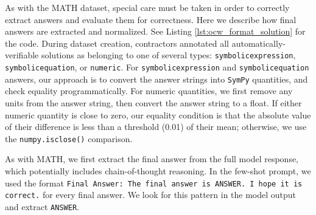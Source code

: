 \documentclass{article}
\begin{document}
As with the MATH dataset, special care must be taken in order to correctly extract answers and evaluate them for correctness. Here we describe how final answers are extracted and normalized. See Listing \ref{lst:ocw_format_solution} for the code. During dataset creation, contractors annotated all automatically-verifiable solutions as belonging to one of several types:  \texttt{symbolicexpression}, \texttt{symbolicequation}, or \texttt{numeric}. For \texttt{symbolicexpression} and \texttt{symbolicequation} answers, our approach is to convert the answer strings into \texttt{SymPy} quantities, and check equality programmatically.  For numeric quantities, we first remove any units from the answer string, then convert the answer string to a float.  If either numeric quantity is close to zero, our equality condition is that the absolute value of their difference is less than a threshold (0.01) of their mean; otherwise, we use the \texttt{numpy.isclose()} comparison.

As with MATH, we first extract the final answer from the full model response, which potentially includes chain-of-thought reasoning. In the few-shot prompt, we used the format \texttt{Final Answer: The final answer is ANSWER. I hope it is correct.} for every final answer. We look for this pattern in the model output and extract \texttt{ANSWER}.
\end{document}
